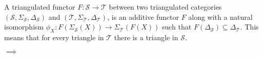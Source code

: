     \begin{definition}
        A triangulated functor $F: \mathcal{S} \rightarrow \mathcal{T}$ between two triangulated categories $(\mathcal{S}, \Sigma_{\mathcal{S}}, \Delta_\mathcal{S})$ and $(\mathcal{T}, \Sigma_{\mathcal{T}}, \Delta_\mathcal{T})$, is an additive functor $F$ along with a natural isomorphism $\phi_X : F(\Sigma_{\mathcal{S}}(X)) \rightarrow \Sigma_{\mathcal{T}}(F(X))$ such that $F(\Delta_{\mathcal{S}}) \subseteq \Delta_{\mathcal{T}}$. This means that for every triangle in $\mathcal{T}$ there is a triangle in $\mathcal{S}$.
        \begin{center}
            $\implies$
        \end{center}
    \end{definition}
 
